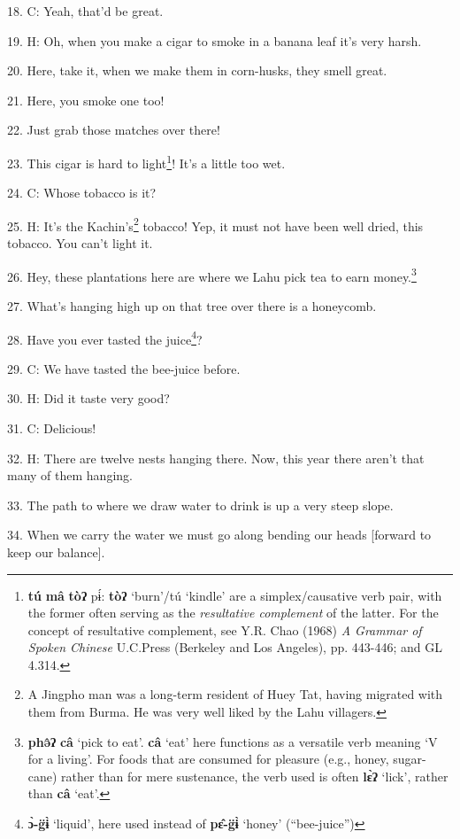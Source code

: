 18. C: Yeah, that'd be great.

19. H: Oh, when you make a cigar to smoke in a banana leaf it's very harsh.

20. Here, take it, when we make them in corn-husks, they smell great.

21. Here, you smoke one too!

22. Just grab those matches over there!

23. This cigar is hard to light\footnote{\textbf{tú} \textbf{mâ} \textbf{tòʔ} pɨ́:\textit{\textbf{ }}\textbf{tòʔ} `burn'/tú `kindle' are a simplex/causative verb pair, with the former often serving as the \textit{resultative complement }of the latter. For the concept of resultative complement, see Y.R. Chao (1968) \textit{A Grammar of Spoken Chinese }U.C.Press (Berkeley and Los Angeles), pp. 443-446; and GL 4.314.}! It's a little too wet.

24. C: Whose tobacco is it?

25. H: It's the Kachin's\footnote{A Jingpho man was a long-term resident of Huey Tat, having migrated with them from Burma. He was very well liked by the Lahu villagers.} tobacco! Yep, it must not have been well dried, this
tobacco. You can't light it.

26. Hey, these plantations here are where we Lahu pick tea to earn money.\footnote{\textbf{phə̂ʔ} \textbf{câ} `pick to eat'. \textbf{câ} `eat' here functions as a versatile verb meaning `V for a living'. For foods that are consumed for pleasure (e.g., honey, sugar-cane) rather than for mere sustenance, the verb used is often \textbf{lɛ̀ʔ} `lick', rather than \textbf{câ} `eat'.}

27. What's hanging high up on that tree over there is a honeycomb.

28. Have you ever tasted the juice\footnote{\textbf{ɔ̀-g̈ɨ̀} `liquid', here used instead of \textbf{pɛ̂-g̈ɨ̀} `honey' (``bee-juice'')}?

29. C: We have tasted the bee-juice before.

30. H: Did it taste very good?

31. C: Delicious!

32. H: There are twelve nests hanging there. Now, this year there aren't that many
of them hanging.

33. The path to where we draw water to drink is up a very steep slope.

34. When we carry the water we must go along bending our heads [forward to keep
our balance].

